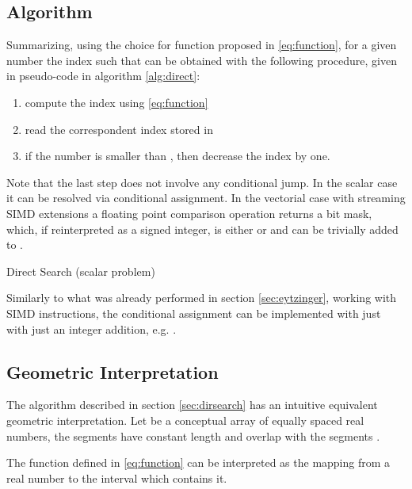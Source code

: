 \documentclass[preprint,1p,times]{elsarticle}
\begin{document}
\subsection{Algorithm}
\label{sec:dirsearch}

Summarizing, using the choice for function  proposed in \eqref{eq:function}, for a given number  the index  such that  can be obtained with the following procedure, given in pseudo-code in algorithm \ref{alg:direct}:
\begin{enumerate}
	\item compute the index  using \eqref{eq:function}
	\item read the correspondent index  stored in 
	\item if the number  is smaller than , then decrease the index  by one.
\end{enumerate}
Note that the last step does not involve any conditional jump. In the scalar case it can be resolved via conditional assignment. In the vectorial case with streaming SIMD extensions a floating point comparison operation returns a bit mask, which, if reinterpreted as a signed integer, is either  or  and can be trivially added to .

\begin{algorithm}
	\caption{Direct Search (scalar problem)}
	\label{alg:direct}
	\begin{algorithmic}
		\Function {\DirectName}{\fin , , ,  \fout }
		\State 
		\State 
		\If {}
			\State  {}
		\EndIf
		\EndFunction
	\end{algorithmic}
\end{algorithm}

Similarly to what was already performed in section \ref{sec:eytzinger}, working with SIMD instructions, the conditional assignment can be implemented with just with just an integer addition, e.g. .


\subsection{Geometric Interpretation}
\label{sec:geometric}

The algorithm described in section \eqref{sec:dirsearch} has an intuitive equivalent geometric interpretation.
Let  be a conceptual array of equally spaced real numbers, the segments  have constant length  and overlap with the segments .

\noindent The function  defined in \eqref{eq:function} can be interpreted as the mapping from a real number  to the interval  which contains it. 
\end{document}
